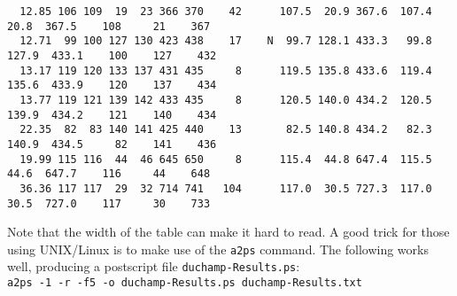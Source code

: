 \begin{landscape}
{\begin{verbatim}
  12.85 106 109  19  23 366 370    42      107.5  20.9 367.6  107.4   20.8  367.5    108     21    367
  12.71  99 100 127 130 423 438    17    N  99.7 128.1 433.3   99.8  127.9  433.1    100    127    432
  13.17 119 120 133 137 431 435     8      119.5 135.8 433.6  119.4  135.6  433.9    120    137    434
  13.77 119 121 139 142 433 435     8      120.5 140.0 434.2  120.5  139.9  434.2    121    140    434
  22.35  82  83 140 141 425 440    13       82.5 140.8 434.2   82.3  140.9  434.5     82    141    436
  19.99 115 116  44  46 645 650     8      115.4  44.8 647.4  115.5   44.6  647.7    116     44    648
  36.36 117 117  29  32 714 741   104      117.0  30.5 727.3  117.0   30.5  727.0    117     30    733

  \end{verbatim}
}

Note that the width of the table can make it hard to read. A good
trick for those using UNIX/Linux is to make use of the \texttt{a2ps}
command. The following works well, producing a postscript file
\texttt{duchamp-Results.ps}:
\\\verb|a2ps -1 -r -f5 -o duchamp-Results.ps duchamp-Results.txt|
\end{landscape}
